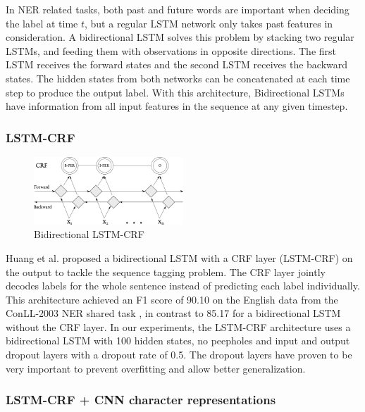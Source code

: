 \documentclass[sigconf]{acmart}
\begin{document}
In NER related tasks, both past and future words are important when deciding the
label at time $ t $, but a regular LSTM network only takes past features in consideration. 
A bidirectional LSTM solves this problem by stacking two regular LSTMs, and feeding
them with observations in opposite directions. The first LSTM receives the forward
states and the second LSTM receives the backward states. The hidden states from both 
networks can be concatenated at each time step to produce the output label. With this 
architecture, Bidirectional LSTMs have information from all input features in the sequence at 
any given timestep.

\subsubsection{LSTM-CRF}
\label{sssec:lstm_crf}

\begin{figure}
  \centering
  \includegraphics[width=0.5\textwidth]{pics/bi_lstm_crf}
  \caption{Bidirectional LSTM-CRF}
  \label{fig:bi_lstm_crf}
\end{figure}

Huang et al. \cite{Huang2015} proposed a bidirectional LSTM with a CRF layer (LSTM-CRF) on the output to tackle
the sequence tagging problem. The CRF layer jointly decodes labels for the whole sentence instead
of predicting each label individually. This architecture achieved an F1 score of 90.10 on the English
data from the ConLL-2003 NER shared task \cite{Sang2003}, in contrast to 85.17 for a bidirectional LSTM without the CRF layer. 
In our experiments, the LSTM-CRF architecture uses a bidirectional LSTM with 100 
hidden states, no peepholes and input and output dropout layers with a dropout
rate of 0.5. The dropout layers have proven to be very important to prevent overfitting 
and allow better generalization.

\subsubsection{LSTM-CRF + CNN character representations}
\label{sssec:lstm_crf_cnn}
\end{document}
